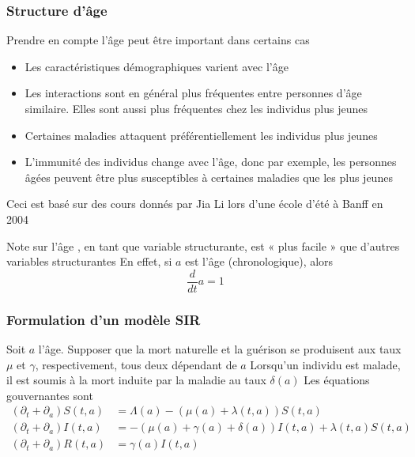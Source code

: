 \documentclass[aspectratio=169]{beamer}\usepackage[]{graphicx}\usepackage[]{xcolor}
\begin{document}
\begin{frame}\frametitle{Structure d'âge}
Prendre en compte l'âge peut être important dans certains cas
\vfill
\begin{itemize}
\item Les caractéristiques démographiques varient avec l'âge
\item Les interactions sont en général plus fréquentes entre personnes d'âge similaire. Elles sont aussi plus fréquentes chez les individus plus jeunes
\item Certaines maladies attaquent préférentiellement les individus plus jeunes
\item L'immunité des individus change avec l'âge, donc par exemple, les personnes âgées peuvent être plus susceptibles à certaines maladies que les plus jeunes
\end{itemize}
\vfill
Ceci est basé sur des cours donnés par Jia Li lors d'une école d'été à Banff en 2004 \nocite{li2008continuous}
\end{frame}

\nocite{brauer2008mathematical}

\begin{frame}{Note sur l'âge}
, en tant que variable structurante, est « plus facile » que d'autres variables structurantes
\vfill
En effet, si $a$ est l'âge (chronologique), alors
\[
\frac{d}{dt}a = 1
\]
\end{frame}


\begin{frame}\frametitle{Formulation d'un modèle SIR}
Soit $a$ l'âge. Supposer que la mort naturelle et la guérison se produisent aux taux $\mu$ et $\gamma$, respectivement, tous deux dépendant de $a$
\vfill
Lorsqu'un individu est malade, il est soumis à la mort induite par la maladie au taux $\delta(a)$
\vfill
Les équations gouvernantes sont
\footnotesize
\begin{subequations}\label{sys:SIR_age_structure}
\begin{align}
(\partial_t+\partial_a)S(t,a) &=
\Lambda(a)-(\mu(a)+\lambda(t,a))S(t,a)
\label{sys:SIR_age_structure_S} \\
(\partial_t+\partial_a)I(t,a) &=
-(\mu(a)+\gamma(a)+\delta(a))I(t,a)+\lambda(t,a)S(t,a)
\label{sys:SIR_age_structure_I} \\
(\partial_t+\partial_a)R(t,a) &=
\gamma(a)I(t,a)
\label{sys:SIR_age_structure_R}
\end{align}
\end{subequations}
\end{frame}
\end{document}
